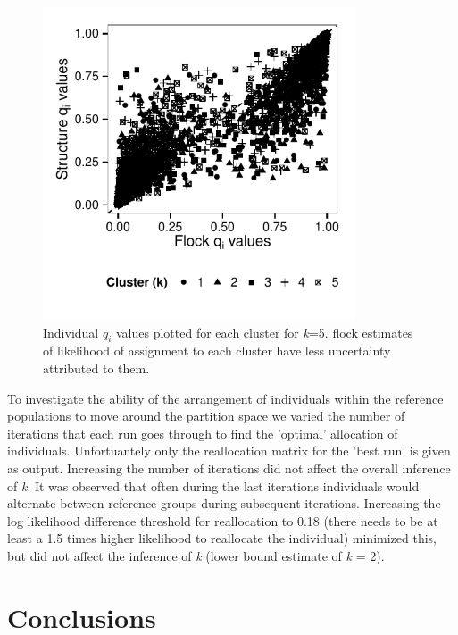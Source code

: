 \begin{figure}
\begin{center}
	
 \includegraphics[width=25em]{images/Figures-Pat/Fig2.pdf}
    \caption{Individual \textit{$q_i$} values plotted for each cluster for \textit{k}=5. 
{\sc flock} estimates of likelihood of assignment to each cluster have less uncertainty
 attributed to them.}
    \label{Fig.2}
\end{center}
\end{figure}


To investigate the ability of the arrangement of individuals within the reference 
populations to move around the partition space we varied the number of iterations that 
each run goes through to find the 'optimal' allocation of individuals. Unfortuantely 
only the reallocation matrix for the 'best run' is given as output. Increasing the 
number of iterations did not affect the overall inference of \textit{k}. It was 
observed that often during the last iterations individuals would alternate between 
reference groups during subsequent iterations. Increasing the log likelihood 
difference threshold for reallocation to 0.18 (there needs to be at least a 1.5 times 
higher likelihood to reallocate the individual) minimized this, but did not affect the 
inference of \textit{k} (lower bound estimate of \textit{k} = 2). 


\section*{Conclusions}

